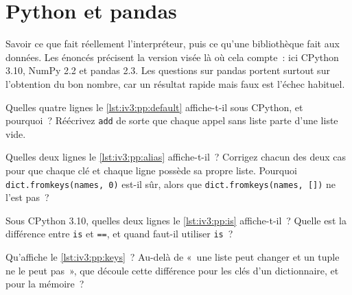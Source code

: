 

\chapter{Python et pandas}\label{ch:iv3:python-and-pandas}

\begin{ivtrains}
Savoir ce que fait réellement l'interpréteur, puis ce qu'une bibliothèque fait aux données. Les énoncés précisent la version visée là où cela compte~: ici CPython 3.10, NumPy 2.2 et pandas 2.3. Les questions sur pandas portent surtout sur l'obtention du bon nombre, car un résultat rapide mais faux est l'échec habituel.
\end{ivtrains}

\begin{question}\label{iq:iv3:python-and-pandas:1}
Quelles quatre lignes le \cref{lst:iv3:pp:default} affiche-t-il sous CPython, et pourquoi~? Réécrivez \texttt{add} de sorte que chaque appel sans liste parte d'une liste vide.
\label{lst:iv3:pp:default}
\end{question}

\begin{question}\label{iq:iv3:python-and-pandas:2}
Quelles deux lignes le \cref{lst:iv3:pp:alias} affiche-t-il~? Corrigez chacun des deux cas pour que chaque clé et chaque ligne possède sa propre liste. Pourquoi \texttt{dict.fromkeys(names, 0)} est-il sûr, alors que \texttt{dict.fromkeys(names, [])} ne l'est pas~?
\label{lst:iv3:pp:alias}
\end{question}

\begin{question}\label{iq:iv3:python-and-pandas:3}
Sous CPython 3.10, quelles deux lignes le \cref{lst:iv3:pp:is} affiche-t-il~? Quelle est la différence entre \texttt{is} et \texttt{==}, et quand faut-il utiliser \texttt{is}~?
\label{lst:iv3:pp:is}
\end{question}

\begin{question}\label{iq:iv3:python-and-pandas:4}
Qu'affiche le \cref{lst:iv3:pp:keys}~? Au-delà de «~une liste peut changer et un tuple ne le peut pas~», que découle cette différence pour les clés d'un dictionnaire, et pour la mémoire~?
\label{lst:iv3:pp:keys}
\end{question}

